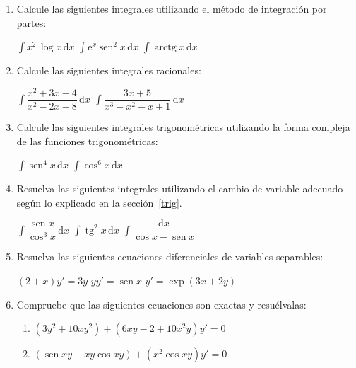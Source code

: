 \begin{enumerate}
\item Calcule las siguientes integrales utilizando el método de integración por partes:
\setcontadoralph
\begin{centrar}
\nitem $\displaystyle\int x^2\,\log x\,\mathrm dx$ \hfill
\nitem $\displaystyle\int \text{e}^x\operatorname{sen}^2 x\,\mathrm dx$ \hfill
\nitem $\displaystyle\int\operatorname{arctg} x \,\mathrm dx$
\end{centrar}

\item
Calcule las siguientes integrales racionales:
\setcontadoralph
\begin{centrar}
\nitem $\displaystyle\int\dfrac{x^2+3x-4}{x^2-2x-8}\,\mathrm dx$ \hfill
\nitem $\displaystyle\int\dfrac{3x+5}{x^3-x^2-x+1}\,\mathrm dx$
\end{centrar}

\item Calcule las siguientes integrales trigonométricas utilizando la forma compleja de las funciones trigonométricas:
\setcontadoralph
\begin{centrar}
\nitem $\displaystyle\int\operatorname{sen}^4 x\,\mathrm dx$\hfill
\nitem $\displaystyle\int\cos^6 x\,\mathrm dx$
\end{centrar}

\item
Resuelva las siguientes integrales utilizando el cambio de variable adecuado según lo explicado en la sección~\ref{trig}.
\setcontadoralph
\begin{centrar}
\nitem $\displaystyle\int\dfrac{\operatorname{sen} x}{\cos^3 x}\,\mathrm dx$ \hfill
\nitem $\displaystyle\int\operatorname{tg}^2 x\,\mathrm dx$ \hfill
\nitem $\displaystyle\int\dfrac{\mathrm dx}{\cos x-\operatorname{sen} x}$
\end{centrar}

\item Resuelva las siguientes ecuaciones diferenciales de variables separables:
\setcontadoralph
\begin{centrar}
\nitem $(2+x)y'=3y$ \hfill
\nitem $yy' =\operatorname{sen} x$ \hfill
\nitem $y'=\exp (3x+2y)$
\end{centrar}

\item
Compruebe que las siguientes ecuaciones son exactas y resuélvalas:
\begin{enumerate}
\item $(3y^2+10xy^2)+(6xy-2+10x^2y)y'=0$
\item $(\operatorname{sen} xy+xy\cos xy)+(x^2\cos xy)y'=0$
\end{enumerate}


\end{enumerate}
